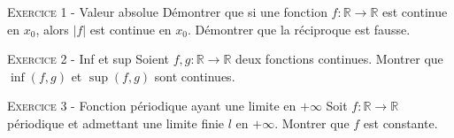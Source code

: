 

\newcommand{\mtn}{\mathbb{N}}
\newcommand{\mtns}{\mathbb{N}^*}
\newcommand{\mtz}{\mathbb{Z}}
\newcommand{\mtr}{\mathbb{R}}
\newcommand{\mtk}{\mathbb{K}}
\newcommand{\mtq}{\mathbb{Q}}
\newcommand{\mtc}{\mathbb{C}}
\newcommand{\mch}{\mathcal{H}}
\newcommand{\mcp}{\mathcal{P}}
\newcommand{\mcb}{\mathcal{B}}
\newcommand{\mcl}{\mathcal{L}}
\newcommand{\mcm}{\mathcal{M}}
\newcommand{\mcc}{\mathcal{C}}
\newcommand{\mcmn}{\mathcal{M}}
\newcommand{\mcmnr}{\mathcal{M}_n(\mtr)}
\newcommand{\mcmnk}{\mathcal{M}_n(\mtk)}
\newcommand{\mcsn}{\mathcal{S}_n}
\newcommand{\mcs}{\mathcal{S}}
\newcommand{\mcd}{\mathcal{D}}
\newcommand{\mcsns}{\mathcal{S}_n^{++}}
\newcommand{\glnk}{GL_n(\mtk)}
\newcommand{\mnr}{\mathcal{M}_n(\mtr)}
\DeclareMathOperator{\ch}{ch}
\DeclareMathOperator{\sh}{sh}
\DeclareMathOperator{\vect}{vect}
\DeclareMathOperator{\card}{card}
\DeclareMathOperator{\comat}{comat}
\DeclareMathOperator{\imv}{Im}
\DeclareMathOperator{\rang}{rg}
\DeclareMathOperator{\Fr}{Fr}
\DeclareMathOperator{\diam}{diam}
\DeclareMathOperator{\supp}{supp}
\newcommand{\veps}{\varepsilon}
\newcommand{\mcu}{\mathcal{U}}
\newcommand{\mcun}{\mcu_n}
\newcommand{\dis}{\displaystyle}
\newcommand{\croouv}{[\![}
\newcommand{\crofer}{]\!]}
\newcommand{\rab}{\mathcal{R}(a,b)}
\newcommand{\pss}[2]{\langle #1,#2\rangle}

 

\begin{center}\textsc{{\huge }}\end{center}



\vskip0.3cm\noindent\textsc{Exercice 1} - Valeur absolue
\vskip0.2cm
Démontrer que si une fonction $f:\mathbb R\to\mathbb R$ est continue en $x_0$, alors $|f|$ est continue en $x_0$. Démontrer que la réciproque est fausse.




\vskip0.3cm\noindent\textsc{Exercice 2} - Inf et sup
\vskip0.2cm
Soient $f,g:\mathbb R\to\mathbb R$ deux fonctions continues.
Montrer que $\inf(f,g)$ et $\sup(f,g)$ sont continues.




\vskip0.3cm\noindent\textsc{Exercice 3} - Fonction périodique ayant une limite en $+\infty$
\vskip0.2cm
Soit $f:\mathbb R\to\mathbb R$ périodique et admettant une limite finie $l$ en $+\infty$. Montrer que $f$ est constante.




\vskip0.5cm

